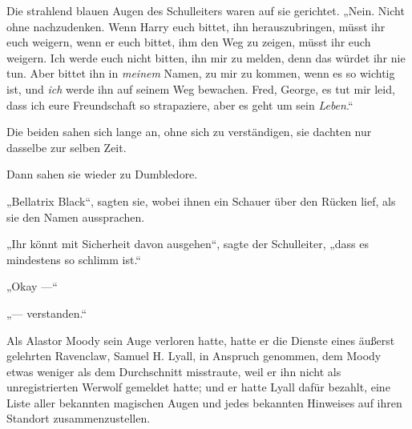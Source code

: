Die strahlend blauen Augen des Schulleiters waren auf sie gerichtet.
„Nein. Nicht ohne nachzudenken. Wenn Harry euch bittet, ihn herauszubringen, müsst ihr euch weigern, wenn er euch bittet, ihm den Weg zu zeigen, müsst ihr euch weigern. Ich werde euch nicht bitten, ihn mir zu melden, denn das würdet ihr nie tun. Aber bittet ihn in \emph{meinem} Namen, zu mir zu kommen, wenn es so wichtig ist, und \emph{ich} werde ihn auf seinem Weg bewachen. Fred, George, es tut mir leid, dass ich eure Freundschaft so strapaziere, aber es geht um sein \emph{Leben}.“

Die beiden sahen sich lange an, ohne sich zu verständigen, sie dachten nur dasselbe zur selben Zeit.

Dann sahen sie wieder zu Dumbledore.

„Bellatrix Black“, sagten sie, wobei ihnen ein Schauer über den Rücken lief, als sie den Namen aussprachen.

„Ihr könnt mit Sicherheit davon ausgehen“, sagte der Schulleiter, „dass es mindestens so schlimm ist.“

„Okay —“

„— verstanden.“


Als Alastor Moody sein Auge verloren hatte, hatte er die Dienste eines äußerst gelehrten Ravenclaw, Samuel H. Lyall, in Anspruch genommen, dem Moody etwas weniger als dem Durchschnitt misstraute, weil er ihn nicht als unregistrierten Werwolf gemeldet hatte; und er hatte Lyall dafür bezahlt, eine Liste aller bekannten magischen Augen und jedes bekannten Hinweises auf ihren Standort zusammenzustellen.

